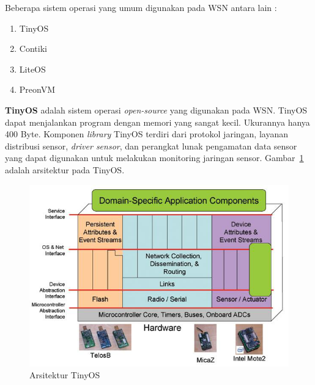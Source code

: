 \documentclass[a4paper,twoside]{article}
\begin{document}
\begin{enumerate}
Beberapa sistem operasi yang umum digunakan pada WSN antara lain :
\begin{enumerate}
	\item TinyOS
	\item Contiki
	\item LiteOS
	\item PreonVM
	
\end{enumerate}
		
		\textbf{TinyOS} adalah sistem operasi \textit{open-source} yang digunakan pada WSN. TinyOS dapat menjalankan program dengan memori yang sangat kecil. Ukurannya hanya 400 Byte. Komponen \textit{library} TinyOS terdiri dari protokol jaringan, layanan distribusi sensor, \textit{driver sensor}, dan perangkat lunak pengamatan data sensor yang dapat digunakan untuk melakukan monitoring jaringan sensor. Gambar~\ref{fig:tinyOS} adalah arsitektur pada TinyOS. 
\begin{figure} [H]
	\centering  
	\includegraphics[scale=0.5]{Gambar/tinyOS}  
	\caption[Arsitektur TinyOS]{Arsitektur TinyOS} 
	\label{fig:tinyOS} 
\end{figure}


\end{enumerate}
\end{document}
